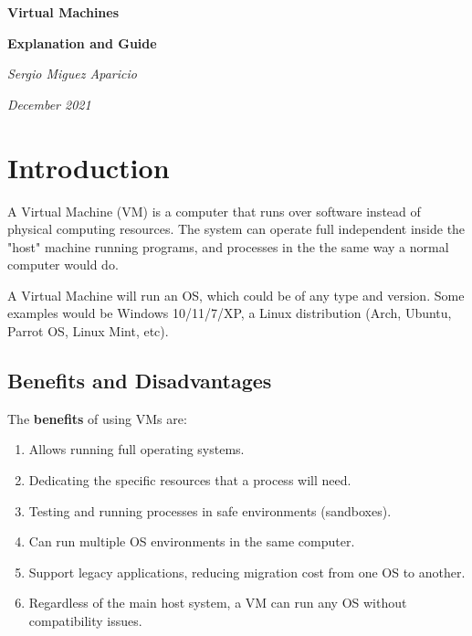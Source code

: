 \documentclass[a4paper]{article}
\newcommand{\sectionName}{Contents}
\newcommand\tab[1][1cm]{\hspace*{#1}}
\begin{document}
    \cfoot{\thepage}
    \begin{titlepage}
        \centering
        \vfill
        {\huge\bfseries{Virtual Machines}} \par
        \vspace{0.2cm}
        {\LARGE{\textbf{Explanation and Guide}}} \par
        \vfill
        {
            \large{
                \textit{Sergio Miguez Aparicio} \par
                \textit{December 2021} \par
                }
        }
        \vfill
        
    \end{titlepage}


    \clearpage 
    \tableofcontents

    \clearpage
    \section{\textbf{Introduction}}
    \renewcommand{\sectionName}{Introduction}
    \tab A Virtual Machine (VM) is a computer that runs over software instead of physical computing resources.
    The system can operate full independent inside the "host" machine running programs, and processes in the
    the same way a normal computer would do.

    \tab A Virtual Machine will run an OS, which could be of any type and version. Some examples would be 
    Windows 10/11/7/XP, a Linux distribution (Arch, Ubuntu, Parrot OS, Linux Mint, etc).

    \vspace{0.5cm}
    \subsection{Benefits and Disadvantages}
    
    \tab The \textbf{benefits} of using VMs are:
    \begin{enumerate}
        \item Allows running full operating systems.
        \item Dedicating the specific resources that a process will need.
        \item Testing and running processes in safe environments (sandboxes).
        \item Can run multiple OS environments in the same computer.
        \item Support legacy applications, reducing migration cost from one OS to another.
        \item Regardless of the main host system, a VM can run any OS without compatibility issues.
    \end{enumerate}
    
\end{document}
